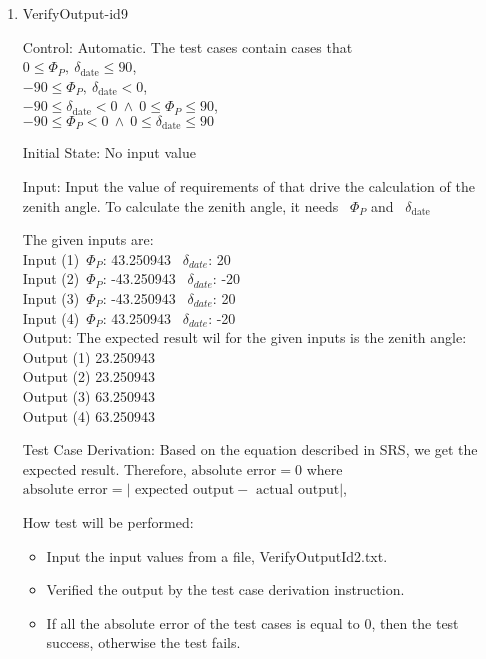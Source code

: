 \documentclass[12pt, titlepage]{article}
\begin{document}
\begin{enumerate}
\begin{itemize}
\end{itemize}

\item{VerifyOutput-id9\\}

Control: Automatic. The test cases contain cases that\\ $0 \leq \Phi_P,
~\delta_\text{date} \leq 90$,\\$-90 \leq \Phi_P, ~\delta_\text{date} < 0$,
\\$-90 \leq \delta_\text{date} < 0 ~ \land ~ 0 \leq \Phi_P \leq 90$, \\$-90
\leq\Phi_P < 0 ~ \land ~0 \leq \delta_\text{date} \leq 90$ 

Initial State: No input value

Input: Input the value of requirements of \progname that drive the calculation
of the zenith angle. To calculate the zenith angle, it needs ~$\Phi_P$ and
~$\delta_\text{date}$ 

The given inputs are:\\ 
Input (1)~$\Phi_P$: 43.250943
~$\delta_{date}$: 20\\ 
Input (2)~$\Phi_P$: -43.250943 ~$\delta_{date}$: -20\\
Input (3)~$\Phi_P$: -43.250943 ~$\delta_{date}$: 20\\ 
Input (4)~$\Phi_P$: 43.250943 ~$\delta_{date}$: -20\\

Output: The expected result wil for the given inputs is the zenith angle:\\
Output (1) 23.250943\\ Output (2) 23.250943\\ Output (3) 63.250943\\ Output (4)
63.250943\\


Test Case Derivation: Based on the equation described in SRS\cite{YS2019}, we
get the expected result. Therefore, $\text{absolute error} = 0$ where
$\text{absolute error} = |\text{ expected output} - \text{ actual output}|$,

How test will be performed: 
\begin{itemize} 
\item Input the input values from a file, VerifyOutputId2.txt. 
\item Verified the output by the test case derivation instruction. 
\item If all the absolute error of the test cases is equal to 0, then the test
success, otherwise the test fails.
\end{itemize}


\end{enumerate}
\end{document}

